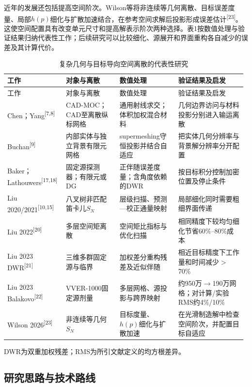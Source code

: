 \documentclass[UTF8, zihao=-4, fontset=none, a4paper]{ctexart}
\newcommand{\upcite}[1]{\textsuperscript{[#1]}}
\begin{document}
近年的发展还包括提高空间阶次。Wilson等将非连续等几何离散、目标误差度量、局部\(h(p)\)细化与扩散加速结合，在参考空间求解后投影形成误差估计\upcite{23}。这使空间配置具有改变单元尺寸和提高解表示阶次两种选择。表1按数值处理与验证结果归纳代表性工作；后续研究可以比较细化、源展开和界面重构各自减少的误差及其计算代价。 \begin{longtable}{@{}>{\raggedright\arraybackslash}p{0.24\linewidth}>{\raggedright\arraybackslash}p{0.22\linewidth}>{\raggedright\arraybackslash}p{0.24\linewidth}>{\raggedright\arraybackslash}p{0.28\linewidth}@{}}
\caption{复杂几何与目标导向空间离散的代表性研究}\label{tab:1}\\
\toprule
工作 & 对象与离散 & 数值处理 & 验证结果及启发 \\
\midrule
\endfirsthead
\toprule
工作 & 对象与离散 & 数值处理 & 验证结果及启发 \\
\midrule
\endhead
\bottomrule
\endlastfoot
Chen；Yang\upcite{7,8} & CAD-MOC；CAD至离散纵标网格 & 通用射线求交；体积加权混合材料 & 几何边界访问与材料投影分别进入输运离散 \\
Buchan\upcite{9} & 内部实体与独立背景有限元网格 & supermeshing守恒投影并结合自适应 & 把实体几何分辨率与背景解分辨率分开配置 \\
Baker；Lathouwers\upcite{17,18} & 固定源探测器；有限元或DG & 正伴随误差度量；含角度依赖的DWR & 按目标积分控制加密位置及停止条件 \\
Liu 2020/2021\upcite{10,15} & 八叉树非匹配笛卡儿$S_N$ & 层级扫描、预测—校正通量映射 & 局部细化同时需要粗细界面传递 \\
Liu 2022\upcite{20} & 多层空间矩离散 & 空间矩比指标与优化扫描 & 相同精度下较均匀细化节省60\%--80\%成本 \\
Liu 2023 DWR\upcite{21} & 三维多群固定源与临界 & 加权差分重构残差及近似伴随 & 相近目标精度下工作量和时间减少$>$70\% \\
Liu 2023 Balakovo\upcite{22} & VVER-1000固定源剂量 & 多层网格、源投影与跨界映射 & 约950万$\rightarrow$190万网格；对计算/实验RMS约4\%/10\% \\
Wilson 2026\upcite{23} & 非连续等几何$S_N$ & 目标度量、$h(p)$细化与扩散加速 & 在光滑制造解中检查空间阶次，并配置目标自适应 \\
\end{longtable}

DWR为双重加权残差；RMS为所引文献定义的均方根差异。

\subsection{研究思路与技术路线}
\end{document}

